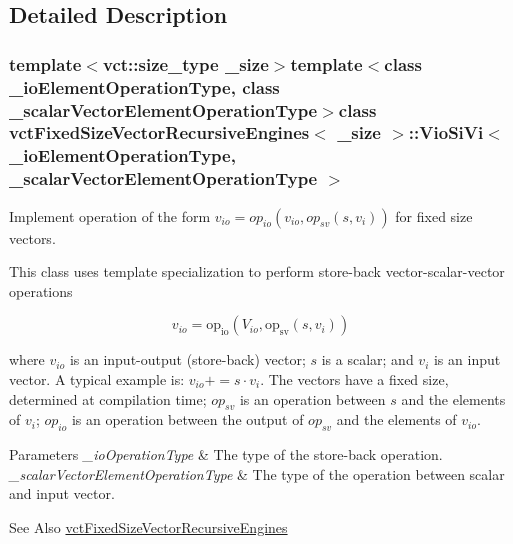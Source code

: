 \subsection{Detailed Description}
\subsubsection*{template$<$vct\-::size\-\_\-type \-\_\-size$>$template$<$class \-\_\-io\-Element\-Operation\-Type, class \-\_\-scalar\-Vector\-Element\-Operation\-Type$>$class vct\-Fixed\-Size\-Vector\-Recursive\-Engines$<$ \-\_\-size $>$\-::\-Vio\-Si\-Vi$<$ \-\_\-io\-Element\-Operation\-Type, \-\_\-scalar\-Vector\-Element\-Operation\-Type $>$}

Implement operation of the form $v_{io} = op_{io}(v_{io}, op_{sv}(s, v_i))$ for fixed size vectors. 

This class uses template specialization to perform store-\/back vector-\/scalar-\/vector operations

\[ v_{io} = \mathrm{op_{io}}(V_{io}, \mathrm{op_{sv}}(s, v_i)) \]

where $v_{io}$ is an input-\/output (store-\/back) vector; $s$ is a scalar; and $v_i$ is an input vector. A typical example is\-: $v_{io} += s \cdot v_i$. The vectors have a fixed size, determined at compilation time; $op_{sv}$ is an operation between $s$ and the elements of $v_i$; $op_{io}$ is an operation between the output of $op_{sv}$ and the elements of $v_{io}$.


\begin{DoxyParams}{Parameters}
{\em \-\_\-io\-Operation\-Type} & The type of the store-\/back operation.\\
\hline
{\em \-\_\-scalar\-Vector\-Element\-Operation\-Type} & The type of the operation between scalar and input vector.\\
\hline
\end{DoxyParams}
\begin{DoxySeeAlso}{See Also}
\hyperlink{classvct_fixed_size_vector_recursive_engines}{vct\-Fixed\-Size\-Vector\-Recursive\-Engines} 
\end{DoxySeeAlso}


